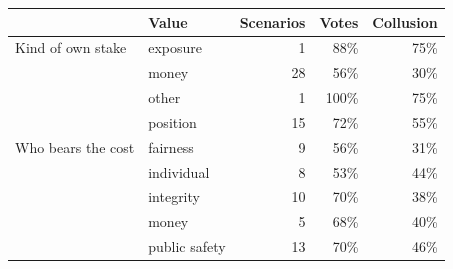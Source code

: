 \begin{tabular}{@{}llrrr@{}}
\toprule
 & Value & Scenarios & Votes & Collusion \\
\midrule
Kind of own stake & exposure & 1 & 88\% & 75\% \\
 & money & 28 & 56\% & 30\% \\
 & other & 1 & 100\% & 75\% \\
 & position & 15 & 72\% & 55\% \\
\addlinespace
Who bears the cost & fairness & 9 & 56\% & 31\% \\
 & individual & 8 & 53\% & 44\% \\
 & integrity & 10 & 70\% & 38\% \\
 & money & 5 & 68\% & 40\% \\
 & public safety & 13 & 70\% & 46\% \\
\bottomrule
\end{tabular}
